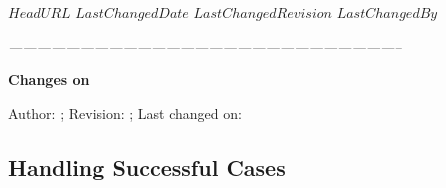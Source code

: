 \svnidlong
{$HeadURL$}
{$LastChangedDate$}
{$LastChangedRevision$}
{$LastChangedBy$}


\begin{thoughts}
\itshape
\hfil -----------------------------------------------------------------------------------\par
\hfil \textbf{Changes on \currfilename}

Author: \svnfileauthor; Revision: \svnfilerev; Last changed on: \svnfiledate
\end{thoughts}


\subsection{Handling Successful Cases}
\label{sec:improvement}






